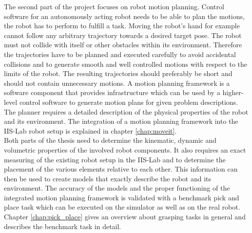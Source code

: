 The second part of the project focuses on robot motion planning. Control software for an autonomously acting robot needs to be able to plan the motions, the robot has to perform to fulfill a task. Moving the robot's hand for example cannot follow any arbitrary trajectory towards a desired target pose. The robot must not collide with itself or other obstacles within its environment. Therefore the trajectories have to be planned and executed carefully to avoid accidental collisions and to generate smooth and well controlled motions with respect to the limits of the robot. The resulting trajectories should preferably be short and should not contain unnecessary motions. A motion planning framework is a software component that provides infrastructure which can be used by a higher-level control software to generate motion plans for given problem descriptions. The planner requires a detailed description of the physical properties of the robot and its environment. The integration of a motion planning framework into the IIS-Lab robot setup is explained in chapter \ref{chap:moveit}. \\

Both parts of the thesis need to determine the kinematic, dynamic and volumetric properties of the involved robot components. It also requires an exact measuring of the existing robot setup in the IIS-Lab and to determine the placement of the various elements relative to each other. This information can then be used to create models that exactly describe the robot and its environment. The accuracy of the models and the proper functioning of the integrated motion planning framework is validated with a benchmark pick and place task which can be executed on the simulator as well as on the real robot. Chapter \ref{chap:pick_place} gives an overview about grasping tasks in general and describes the benchmark task in detail.


